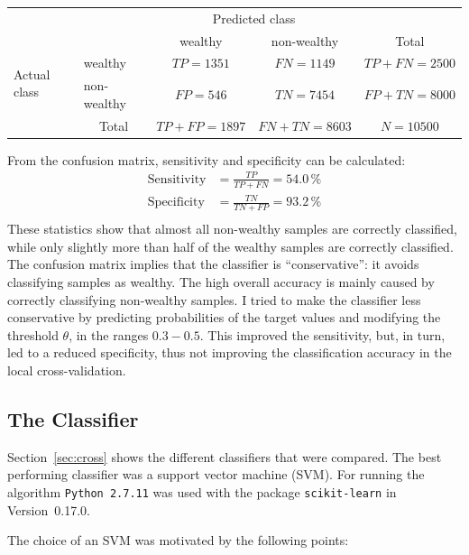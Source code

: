 \documentclass[a4paper]{article}
\begin{document}
\begin{table}[h]
\centering
\begin{tabular}{l|l|c|c|c}
\multicolumn{2}{c}{}&\multicolumn{2}{c}{Predicted class}&\\
\cline{3-4}
\multicolumn{2}{c|}{}&wealthy & non-wealthy &\multicolumn{1}{c}{Total}\\
\cline{2-4}
\multirow{2}{*}{Actual class}& wealthy & $TP = 1351$ & $FN = 1149$ & $TP+FN = 2500$\\
\cline{2-4}
& non-wealthy & $FP = 546$ & $TN = 7454$ & $FP+TN = 8000$\\
\cline{2-4}
\multicolumn{1}{c}{} & \multicolumn{1}{c}{Total} & \multicolumn{1}{c}{$TP+FP=1897$} & \multicolumn{1}{c}{$FN+TN = 8603$} & \multicolumn{1}{c}{$N = 10500$}\\
\end{tabular}
\end{table}
From the confusion matrix, sensitivity and specificity can be calculated:
\begin{align}
\text{Sensitivity} &= \frac{TP}{TP + FN} = 54.0\,\%\\
\text{Specificity}    &= \frac{TN}{TN + FP} = 93.2\,\%\\
\end{align}
These statistics show that almost all non-wealthy samples are
correctly classified, while only slightly more than half of the
wealthy samples are correctly classified. The confusion matrix implies
that the classifier is ``conservative'': it avoids classifying samples
as wealthy. The high overall accuracy is mainly caused by correctly
classifying non-wealthy samples. I tried to make the classifier less
conservative by predicting probabilities of the target values and
modifying the threshold $\theta$, in the ranges $0.3 - 0.5$. This
improved the sensitivity, but, in turn, led to a reduced specificity,
thus not improving the classification accuracy in the local
cross-validation.

\subsection{The Classifier}

Section~\ref{sec:cross} shows the different classifiers that were
compared. The best performing classifier was a support vector machine
(SVM). For running the algorithm \texttt{Python~2.7.11} was used with
the package \texttt{scikit-learn} in Version~0.17.0.

The choice of an SVM was motivated by the following points:
\end{document}
